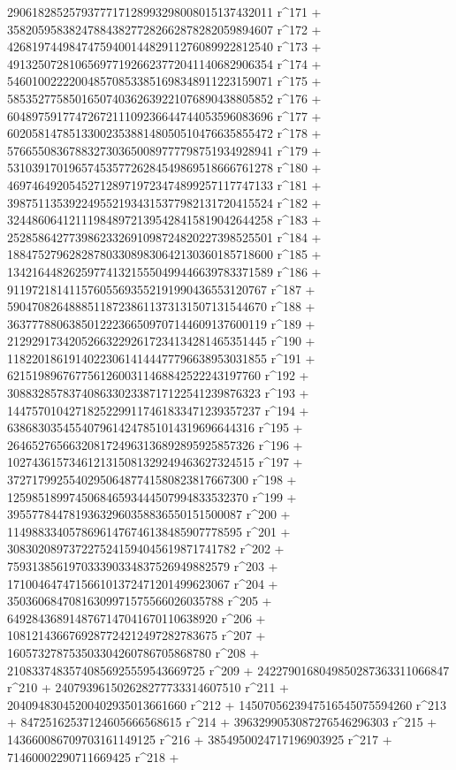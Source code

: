        2906182852579377717128993298008015137432011 r^171 + 
       3582059583824788438277282662878282059894607 r^172 + 
       4268197449847475940014482911276089922812540 r^173 + 
       4913250728106569771926623772041140682906354 r^174 + 
       5460100222200485708533851698348911223159071 r^175 + 
       5853527758501650740362639221076890438805852 r^176 + 
       6048975917747267211109236644744053596083696 r^177 + 
       6020581478513300235388148050510476635855472 r^178 + 
       5766550836788327303650089777798751934928941 r^179 + 
       5310391701965745357726284549869518666761278 r^180 + 
       4697464920545271289719723474899257117747133 r^181 + 
       3987511353922495521934315377982131720415524 r^182 + 
       3244860641211198489721395428415819042644258 r^183 + 
       2528586427739862332691098724820227398525501 r^184 + 
       1884752796282878033089830642130360185718600 r^185 + 
       1342164482625977413215550499446639783371589 r^186 + 
       911972181411576055693552191990436553120767 r^187 + 
       590470826488851187238611373131507131544670 r^188 + 
       363777880638501222366509707144609137600119 r^189 + 
       212929173420526632292617234134281465351445 r^190 + 
       118220186191402230614144477796638953031855 r^191 + 
       62151989676775612600311468842522243197760 r^192 + 
       30883285783740863302338717122541239876323 r^193 + 
       14475701042718252299117461833471239357237 r^194 + 
       6386830354554079614247851014319696644316 r^195 + 
       2646527656632081724963136892895925857326 r^196 + 
       1027436157346121315081329249463627324515 r^197 + 
       372717992554029506487741580823817667300 r^198 + 
       125985189974506846593444507994833532370 r^199 + 
       39557784478193632960358836550151500087 r^200 + 
       11498833405786961476746138485907778595 r^201 + 
       3083020897372275241594045619871741782 r^202 + 
       759313856197033390334837526949882579 r^203 + 
       171004647471566101372471201499623067 r^204 + 
       35036068470816309971575566026035788 r^205 + 
       6492843689148767147041670110638920 r^206 + 
       1081214366769287724212497282783675 r^207 + 
       160573278753503304260786705868780 r^208 + 
       21083374835740856925559543669725 r^209 + 
       2422790168049850287363311066847 r^210 + 
       240793961502628277733314607510 r^211 + 
       20409483045200402935013661660 r^212 + 
       1450705623947516545075594260 r^213 + 
       84725162537124605666568615 r^214 + 
       3963299053087276546296303 r^215 + 
       143660086709703161149125 r^216 + 
       3854950024717196903925 r^217 + 71460002290711669425 r^218 + 
